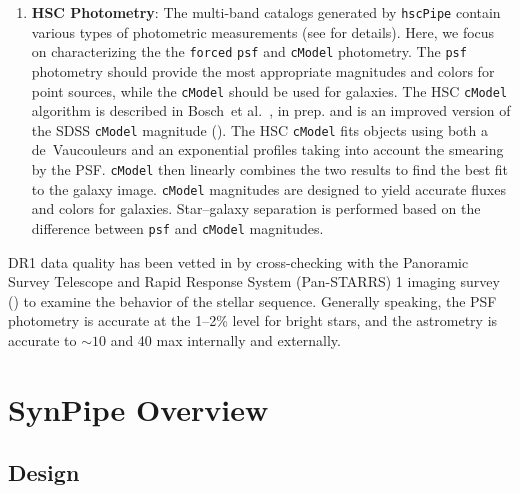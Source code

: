 \documentclass[useamsfonts]{pasj01}
\def\etal{{\ et al.~}}
\def\hscpipe{\texttt{hscPipe}}
\def\cmodel{\texttt{cModel}}
\def\forced{\texttt{forced}}
\begin{document}
\begin{enumerate}
        \item \textbf{HSC Photometry}:
            The multi-band catalogs generated by \hscpipe{} contain various types of 
            photometric measurements (see \citealt{HSCDR1} for details). 
            Here, we focus on characterizing the the \forced{} \texttt{psf} and 
            \cmodel{} photometry. 
            The \texttt{psf} photometry should provide the most appropriate magnitudes 
            and colors for point sources, while the \cmodel{} should be used for 
            galaxies. 
            The HSC \cmodel{} algorithm is described in Bosch\etal, in prep. and is an
            improved version of the SDSS \cmodel{} magnitude (\citealt{Lupton2001, 
            Abazajian2004}). 
            The HSC \cmodel{} fits objects using both a de~Vaucouleurs and an 
            exponential profiles taking into account the smearing by the PSF.  
            \cmodel{} then linearly combines the two results to find the best fit to 
            the galaxy image. 
            \cmodel{} magnitudes are designed to yield accurate fluxes and colors for 
            galaxies. 
            Star--galaxy separation is performed based on the difference between 
            \texttt{psf} and \cmodel{}{} magnitudes.
            
    \end{enumerate}

    DR1 data quality has been vetted in \citet{HSCDR1} by cross-checking with the 
    Panoramic Survey Telescope and Rapid Response System (Pan-STARRS) 1 imaging survey
    (\citealt{Schlafly2012, Tonry2012, Magnier2013}) to examine the behavior of the 
    stellar sequence.
    Generally speaking, the PSF photometry is accurate at the 1--2\% level for bright 
    stars, and the astrometry is accurate to ${\sim}10$ and 40 max internally and 
    externally.


\section{SynPipe Overview}
    \label{sec:synpipe}

\subsection{Design}
    \label{ssec:design}
\end{document}
